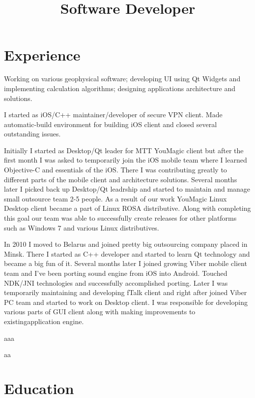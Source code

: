 \documentclass[11pt, a4paper]{moderncv}
\title{Software Developer}
\begin{document}
 
\maketitle

\section{Experience}

{
Working on various geophysical software; 
developing UI using Qt Widgets and implementing calculation algorithms; 
designing applications architecture and solutions.
}

{
I started as iOS/C++ maintainer/developer of secure VPN client.
Made automatic-build environment for building iOS client and closed several outstanding issues.
}

{
Initially I started as Desktop/Qt leader for MTT YouMagic client but after the first month I was asked to temporarily join the iOS mobile team where  
I learned Objective-C and essentials of the iOS. There I was contributing greatly to different parts of the mobile client and architecture solutions.
Several months later I picked back up Desktop/Qt leadrship and started to maintain and manage small outsource team 2-5 people. 
As a result of our work YouMagic Linux Desktop client became a part of Linux ROSA distributive.
Along with completing this goal our team was able to successfully create releases for other platforms such as Windows 7 and various Linux distributives.
}

{
In 2010 I moved to Belarus and joined pretty big outsourcing company placed in Minsk. 
There I started as C++ developer and started to learn Qt technology and became a big fun of it.
Several months later I joined growing Viber mobile client team and I've been porting sound engine from iOS into Android. 
Touched NDK/JNI technologies and successfully accomplished porting.
Later I was temporarily maintaining and developing fTalk client and right after joined Viber PC team and started to work on Desktop client.
I was responsible for developing various parts of GUI client along with making improvements to existingapplication engine.
}

{
aaa
}

{
aa
}

\section{Education}

 
 
\end{document}
